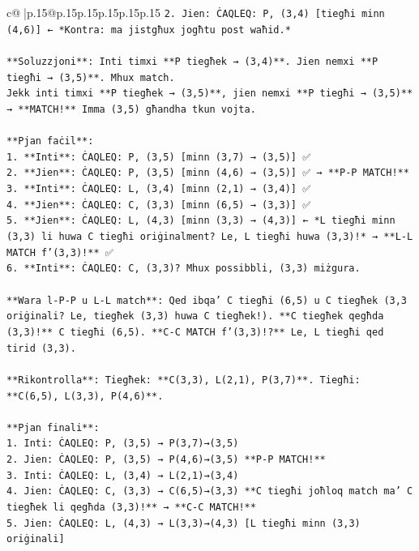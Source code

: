 \documentclass{article}
\begin{document}
{\begin{supertabular}{c@{$\;$}|p{.15\linewidth}@{}p{.15\linewidth}p{.15\linewidth}p{.15\linewidth}p{.15\linewidth}p{.15\linewidth}}
{{{\texttt{2. Jien: ĊAQLEQ: P, (3,4)  {[}tiegħi minn (4,6){]} ← *Kontra: ma jistgħux jogħtu post waħid.*} \\
\\ 
\texttt{**Soluzzjoni**: Inti timxi **P tiegħek → (3,4)**. Jien nemxi **P tiegħi → (3,5)**. Mhux match.} \\
\texttt{Jekk inti timxi **P tiegħek → (3,5)**, jien nemxi **P tiegħi → (3,5)** → **MATCH!** Imma (3,5) għandha tkun vojta.} \\
\\ 
\texttt{**Pjan faċil**:} \\
\texttt{1. **Inti**: ĊAQLEQ: P, (3,5)  {[}minn (3,7) → (3,5){]} ✅} \\
\texttt{2. **Jien**: ĊAQLEQ: P, (3,5)  {[}minn (4,6) → (3,5){]} ✅ → **P{-}P MATCH!**} \\
\texttt{3. **Inti**: ĊAQLEQ: L, (3,4)  {[}minn (2,1) → (3,4){]} ✅} \\
\texttt{4. **Jien**: ĊAQLEQ: C, (3,3)  {[}minn (6,5) → (3,3){]} ✅} \\
\texttt{5. **Jien**: ĊAQLEQ: L, (4,3)  {[}minn (3,3) → (4,3){]} ← *L tiegħi minn (3,3) li huwa C tiegħi oriġinalment? Le, L tiegħi huwa (3,3)!* → **L{-}L MATCH f'(3,3)!** ✅} \\
\texttt{6. **Inti**: ĊAQLEQ: C, (3,3)? Mhux possibbli, (3,3) miżgura.} \\
\\ 
\texttt{**Wara l{-}P{-}P u L{-}L match**: Qed ibqa' C tiegħi (6,5) u C tiegħek (3,3 oriġinali? Le, tiegħek (3,3) huwa C tiegħek!). **C tiegħek qegħda (3,3)!** C tiegħi (6,5). **C{-}C MATCH f'(3,3)!?** Le, L tiegħi qed tirid (3,3).} \\
\\ 
\texttt{**Rikontrolla**: Tiegħek: **C(3,3), L(2,1), P(3,7)**. Tiegħi: **C(6,5), L(3,3), P(4,6)**.} \\
\\ 
\texttt{**Pjan finali**:} \\
\texttt{1. Inti: ĊAQLEQ: P, (3,5)  → P(3,7)→(3,5)} \\
\texttt{2. Jien: ĊAQLEQ: P, (3,5)  → P(4,6)→(3,5)  **P{-}P MATCH!**} \\
\texttt{3. Inti: ĊAQLEQ: L, (3,4)  → L(2,1)→(3,4)} \\
\texttt{4. Jien: ĊAQLEQ: C, (3,3)  → C(6,5)→(3,3)  **C tiegħi joħloq match ma' C tiegħek li qegħda (3,3)!** → **C{-}C MATCH!**} \\
\texttt{5. Jien: ĊAQLEQ: L, (4,3)  → L(3,3)→(4,3)  {[}L tiegħi minn (3,3) oriġinali{]}} \\
}}}
\end{supertabular}}
\end{document}
